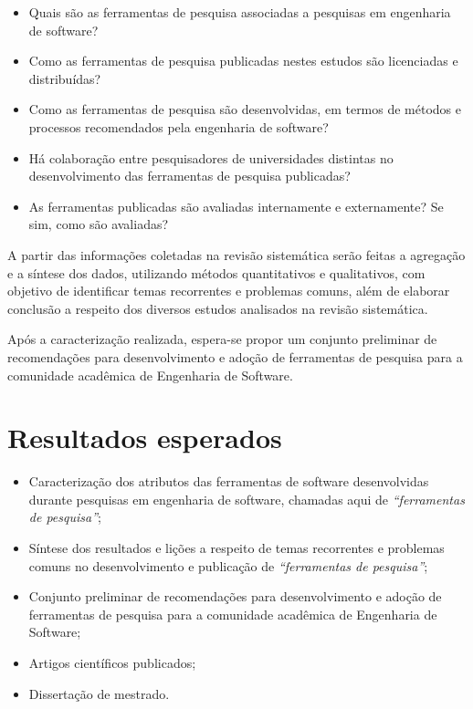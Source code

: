 \documentclass[12pt]{article}
\begin{document}
\begin{itemize}
  \item Quais são as ferramentas de pesquisa associadas a pesquisas em
    engenharia de software?
  \item Como as ferramentas de pesquisa publicadas nestes estudos são
    licenciadas e distribuídas?
  \item Como as ferramentas de pesquisa são desenvolvidas, em termos de
    métodos e processos recomendados pela engenharia de software?
  \item Há colaboração entre pesquisadores de universidades distintas no
    desenvolvimento das ferramentas de pesquisa publicadas?
  \item As ferramentas publicadas são avaliadas internamente e externamente?
    Se sim, como são avaliadas?
\end{itemize}

A partir das informações coletadas na revisão sistemática serão feitas a
agregação e a síntese dos dados, utilizando métodos quantitativos e
qualitativos, com objetivo de identificar temas recorrentes e problemas
comuns, além de elaborar conclusão a respeito dos diversos estudos analisados
na revisão sistemática.

Após a caracterização realizada, espera-se propor um conjunto preliminar de
recomendações para desenvolvimento e adoção de ferramentas de pesquisa para a
comunidade acadêmica de Engenharia de Software.

\section{Resultados esperados}

\begin{itemize}
  \item Caracterização dos atributos das ferramentas de software desenvolvidas
    durante pesquisas em engenharia de software, chamadas aqui de {\it “ferramentas
    de pesquisa”};
  \item Síntese dos resultados e lições a respeito de temas recorrentes e
    problemas comuns no desenvolvimento e publicação de {\it “ferramentas de
    pesquisa”};
  \item Conjunto preliminar de recomendações para desenvolvimento e adoção de
    ferramentas de pesquisa para a comunidade acadêmica de Engenharia de
    Software;
  \item Artigos científicos publicados;
  \item Dissertação de mestrado.
\end{itemize}
\end{document}
